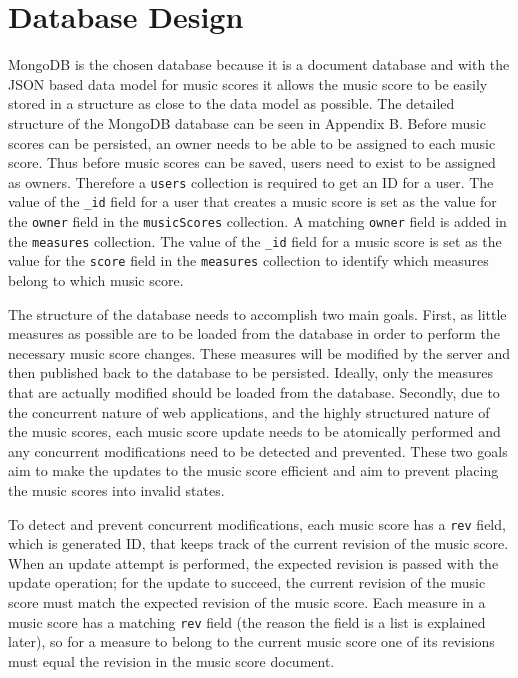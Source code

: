\documentclass[letterpaper,12pt]{article}
\begin{document}
\section{Database Design}

MongoDB is the chosen database because it is a document database and with the JSON based data model for music scores it
allows the music score to be easily stored in a structure as close to the data model as possible. The detailed structure
of the MongoDB database can be seen in Appendix B. Before music scores can be persisted, an owner needs to be able to be
assigned to each music score. Thus before music scores can be saved, users need to exist to be assigned as owners.
Therefore a \lstinline{users} collection is required to get an ID for a user. The value of the \lstinline{_id} field for
a user that creates a music score is set as the value for the \lstinline{owner} field in the \lstinline{musicScores}
collection. A matching \lstinline{owner} field is added in the \lstinline{measures} collection. The value of the
\lstinline{_id} field for a music score is set as the value for the \lstinline{score} field in the \lstinline{measures}
collection to identify which measures belong to which music score.

The structure of the database needs to accomplish two main goals. First, as little measures as possible are to be loaded
from the database in order to perform the necessary music score changes. These measures will be modified by the server
and then published back to the database to be persisted. Ideally, only the measures that are actually modified should be
loaded from the database. Secondly, due to the concurrent nature of web applications, and the highly structured
nature of the music scores, each music score update needs to be atomically performed and any concurrent modifications
need to be detected and prevented. These two goals aim to make the updates to the music score efficient and aim to
prevent placing the music scores into invalid states.

To detect and prevent concurrent modifications, each music score has a \lstinline{rev} field, which is generated ID,
that keeps track of the current revision of the music score. When an update attempt is performed, the expected revision
is passed with the update operation; for the update to succeed, the current revision of the music score must match the
expected revision of the music score. Each measure in a music score has a matching \lstinline{rev} field (the reason the
field is a list is explained later), so for a measure to belong to the current music score one of its revisions
must equal the revision in the music score document.
\end{document}
